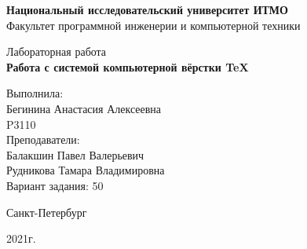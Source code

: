 \thispagestyle{empty}
\begin{center}
    {\bfseries Национальный исследовательский университет ИТМО}\\
    Факультет программной инженерии и компьютерной техники

    \vspace{20em}

    {\large Лабораторная работа }\\
    {\Large \textbf{Работа с системой компьютерной вёрстки \TeX}}
\end{center}

\vspace{15em}

\begin{flushright}
\rule[-3ex]{0pt}{0pt}
    Выполнила:\\
    Бегинина Анастасия Алексеевна\\
    P3110\\
    Преподаватели:\\
    Балакшин Павел Валерьевич\\
    Рудникова Тамара Владимировна\\
    Вариант задания: 50\\

\end{flushright}

\vspace{\fill}

\begin{center}
Санкт-Петербург

2021г.
\end{center}